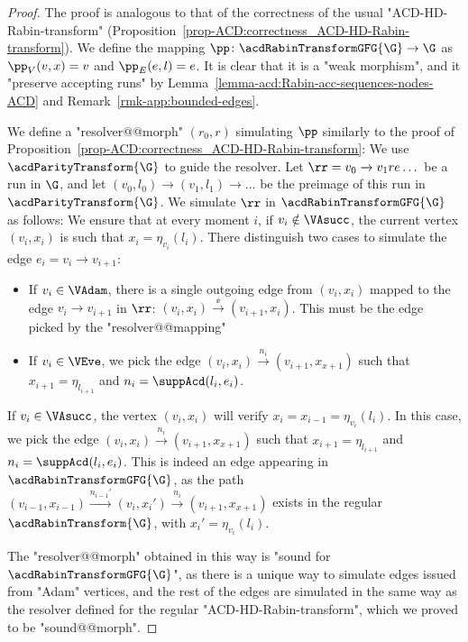 \documentclass[10pt,a4paper]{amsart}
\newcommand{\re}[1]{\xrightarrow{#1}}
\begin{document}
\begin{proof}
	The proof is analogous to that of the correctness of the usual "ACD-HD-Rabin-transform" (Proposition~\ref{prop-ACD:correctness_ACD-HD-Rabin-transform}). We define the mapping $\pp\colon \acdRabinTransformGFG{\G} \to \G$ as $\pp_V(v,x) = v$ and $\pp_E(e,l) = e$. It is clear that it is a "weak morphism", and it "preserve accepting runs" by Lemma~\ref{lemma-acd:Rabin-acc-sequences-nodes-ACD} and Remark~\ref{rmk-app:bounded-edges}.
	
	We define a "resolver@@morph" $(r_0,r)$ simulating $\pp$ similarly to the proof of Proposition~\ref{prop-ACD:correctness_ACD-HD-Rabin-transform}: We use $\acdParityTransform{\G}$ to guide the resolver. Let $\rr = v_0\re{}v_1re{}\dots$ be a run in $\G$, and let $(v_0,l_0)\re{}(v_1,l_1)\re{}\dots$ be the preimage of this run in $\acdParityTransform{\G}$. We simulate $\rr$ in $\acdRabinTransformGFG{\G}$ as follows: We ensure that at every moment $i$, if $v_i\notin \VAsucc$, the current vertex $(v_i,x_i)$ is such that $x_i = \eta_{v_i}(l_i)$. There distinguish two cases to simulate the edge $e_i = v_i\re{}v_{i+1}$:
	\begin{itemize}
		\item If $v_i\in \VAdam$, there is a single outgoing edge from $(v_i,x_i)$ mapped to the edge $v_i\re{}v_{i+1}$ in $\rr$: $(v_i,x_i)\re{\ee}(v_{i+1},x_i)$. This must be the edge picked by the "resolver@@mapping"
		\item If $v_i\in \VEve$, we pick  the edge $(v_i,x_i)\re{n_i}(v_{i+1},x_{x+1})$ such that $x_{i+1} = \eta_{l_{i+1}}$ and $n_i = \suppAcd(l_i, e_i)$.
	\end{itemize} 
	If $v_i\in \VAsucc$, the vertex $(v_i,x_i)$ will verify $x_i = x_{i-1} = \eta_{v_i}(l_i)$. %
	In this case, we pick  the edge $(v_i,x_i)\re{n_i}(v_{i+1},x_{x+1})$ such that $x_{i+1} = \eta_{l_{i+1}}$  and $n_i = \suppAcd(l_i, e_i)$. This is indeed an edge appearing in $\acdRabinTransformGFG{\G}$, as the path $(v_{i-1},x_{i-1})\re{n_{i-1}'}(v_i,x_i')\re{n_i}(v_{i+1},x_{x+1})$ exists in the regular $\acdRabinTransform{\G}$, with $x_i' = \eta_{v_i}(l_i)$.
	
	The "resolver@@morph" obtained in this way is "sound for $\acdRabinTransformGFG{\G}$", as there is a unique way to simulate edges issued from "Adam" vertices, and the rest of the edges are simulated in the same way as the resolver defined for the regular "ACD-HD-Rabin-transform", which we proved to be "sound@@morph".
\end{proof}
 
\end{document}

